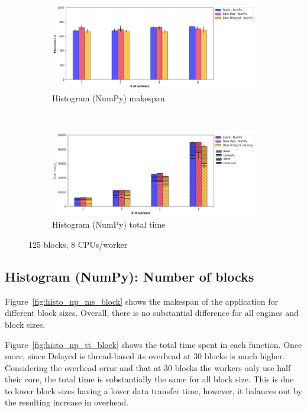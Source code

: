 \documentclass[conference]{IEEEtran}
\begin{document}
\begin{figure}[!t]
    \centering
    \begin{subfigure}[b]{\columnwidth}
        \includegraphics[clip,width=\columnwidth]{images/histo_np_worker.png}%
        \caption{Histogram (NumPy) makespan}\label{fig:histo_np_ms_worker}
    \end{subfigure}
    \\
    \begin{subfigure}[b]{\columnwidth}
        \includegraphics[clip,width=\columnwidth]{images/histo_idle_np_worker.png}%
        \caption{Histogram (NumPy) total time}\label{fig:histo_np_tt_worker}
    \end{subfigure}
    \caption{125 blocks, 8 CPUs/worker}\label{fig:histo_np_worker}
\end{figure}

\subsection{Histogram (NumPy): Number of blocks}
Figure~\ref{fig:histo_np_ms_block} shows the makespan of the application for
different block sizes. Overall, there is no substantial difference for
all engines and block sizes.

Figure~\ref{fig:histo_np_tt_block} shows the total time spent in each function.
Once more, since Delayed is thread-based its overhead at 30 blocks is much
higher. Considering the overhead error and that at 30 blocks
the workers only use half their core, the total time is substantially the same
for all block size. This is due to lower block sizes having a lower data transfer time,
however, it balances out by the resulting increase in overhead.
\end{document}
